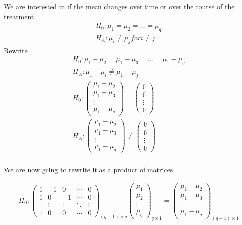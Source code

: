 We are interested in if the mean changes over time or over the course of the treatment.
\begin{gather*}
    H_0: \mu_1=\mu_2=...=\mu_q\\
    H_A:\mu_i \neq \mu_j for i\neq j
\end{gather*}
Rewrite
\begin{gather*}
    H_0: \mu_1-\mu_2 = \mu_1-\mu_3 = ...=\mu_1-\mu_q \\
    H_A: \mu_1 - \mu_i \neq \mu_1-\mu_j\\
    H_0: \begin{pmatrix}
    \mu_1-\mu_2 \\
    \mu_1-\mu_3\\
    \vdots \\
    \mu_1 - \mu_q
    \end{pmatrix}
    =
    \begin{pmatrix}
    0 \\
    0\\
    \vdots\\
    0
    \end{pmatrix}\\
    H_A:\begin{pmatrix}
    \mu_1-\mu_2 \\
    \mu_1-\mu_3\\
    \vdots \\
    \mu_1 - \mu_q
    \end{pmatrix}
    \neq
    \begin{pmatrix}
    0 \\
    0\\
    \vdots\\
    0
    \end{pmatrix}\\
\end{gather*}

We are now going to rewrite it as a product of matrices

\begin{gather*}
    H_0: \begin{pmatrix}
    1 & -1 & 0 & \cdots & 0 \\
    1 & 0 & -1 & \cdots & 0 \\
    \vdots & \vdots & \vdots & \ddots & \vdots \\
    1 & 0 & 0 & \cdots & 0
    \end{pmatrix}_{(q-1)\times q}
    \begin{pmatrix}
    \mu_1 \\
    \mu_2 \\
    \vdots \\
    \mu_q
    \end{pmatrix}_{q \times 1}
    =
    \begin{pmatrix}
    \mu_1 - \mu_2 \\
    \mu_1 - \mu_3 \\
    \vdots
    \\
    \mu_1 - \mu_q
    \end{pmatrix}_{(q-1)\times 1}
\end{gather*}

